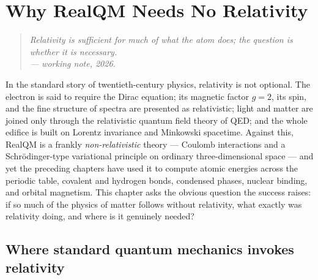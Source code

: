 \chapter{Why RealQM Needs No Relativity}\label{ch:relativity}

\begin{quote}
\itshape Relativity is sufficient for much of what the atom does; the question is whether it is necessary.\\
\normalfont\hfill --- working note, 2026.
\end{quote}
\bigskip

In the standard story of twentieth-century physics, relativity is not optional. The electron is said to require
the Dirac equation; its magnetic factor $g=2$, its spin, and the fine structure of spectra are presented as
relativistic; light and matter are joined only through the relativistic quantum field theory of QED; and the
whole edifice is built on Lorentz invariance and Minkowski spacetime. Against this, RealQM is a frankly
\emph{non-relativistic} theory --- Coulomb interactions and a Schr\"odinger-type variational principle on
ordinary three-dimensional space --- and yet the preceding chapters have used it to compute atomic energies
across the periodic table, covalent and hydrogen bonds, condensed phases, nuclear binding, and orbital
magnetism. This chapter asks the obvious question the success raises: if so much of the physics of matter follows
without relativity, what exactly was relativity doing, and where is it genuinely needed?

\section{Where standard quantum mechanics invokes relativity}\label{sec:where-relativity}

